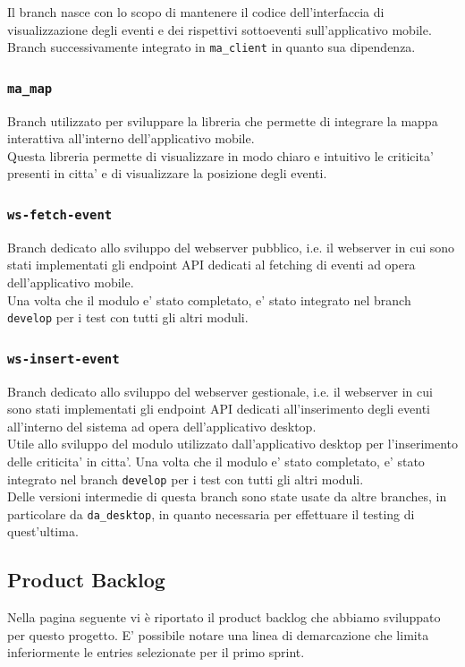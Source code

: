 \documentclass{article}
\begin{document}
Il branch nasce con lo scopo di mantenere il codice dell'interfaccia di visualizzazione degli eventi e dei rispettivi sottoeventi sull'applicativo mobile.
Branch successivamente integrato in \texttt{ma\_client} in quanto sua dipendenza.

\subsubsection{\texttt{ma\_map}}

Branch utilizzato per sviluppare la libreria che permette di integrare la mappa interattiva all'interno dell'applicativo mobile.\\
Questa libreria permette di visualizzare in modo chiaro e intuitivo le criticita' presenti in citta' e di visualizzare la posizione degli eventi.

\subsubsection{\texttt{ws-fetch-event}}

Branch dedicato allo sviluppo del webserver pubblico, i.e. il webserver in cui sono stati implementati gli endpoint API dedicati al fetching di eventi ad opera dell'applicativo mobile.\\
Una volta che il modulo e' stato completato, e' stato integrato nel branch \texttt{develop} per i test con tutti gli altri moduli.

\subsubsection{\texttt{ws-insert-event}}

Branch dedicato allo sviluppo del webserver gestionale, i.e. il webserver in cui sono stati implementati gli endpoint API dedicati all'inserimento degli eventi all'interno del sistema ad opera dell'applicativo desktop. \\
Utile allo sviluppo del modulo utilizzato dall'applicativo desktop per l'inserimento delle criticita' in citta'.
Una volta che il modulo e' stato completato, e' stato integrato nel branch \texttt{develop} per i test con tutti gli altri moduli.\\
Delle versioni intermedie di questa branch sono state usate da altre branches, in particolare da \texttt{da\_desktop}, in quanto necessaria per effettuare il testing di quest'ultima.

\clearpage

\subsection{Product Backlog}
\label{tab:product-backlog}
Nella pagina seguente vi è riportato il product backlog che abbiamo sviluppato per questo progetto. E' possibile notare una linea di demarcazione che limita inferiormente le entries selezionate per il primo sprint.
\end{document}
